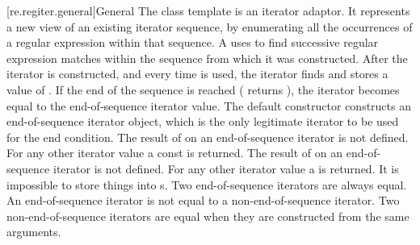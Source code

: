 [re.regiter.general]{General}
\pnum
{}%
%
The class template  is an iterator adaptor.
It represents a new view of an existing iterator sequence, by
enumerating all the occurrences of a regular expression within that
sequence. A  uses   to find successive
regular expression matches within the sequence from which it was
constructed.  After the iterator is constructed, and every time  is
used, the iterator finds and stores a value of
. If the end of the sequence is
reached ( returns ), the iterator becomes equal to
the end-of-sequence iterator value. The default constructor
constructs an end-of-sequence iterator object,
which is the only legitimate iterator to be used for the end
condition. The result of  on an end-of-sequence iterator is not
defined. For any other iterator value a const
 is returned. The result of
 on an end-of-sequence iterator is not defined. For any other
iterator value a  is
returned. It is impossible to store things into s. Two
end-of-sequence iterators are always equal. An end-of-sequence
iterator is not equal to a non-end-of-sequence iterator. Two
non-end-of-sequence iterators are equal when they are constructed from
the same arguments.

